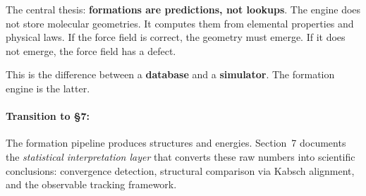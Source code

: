 \documentclass[11pt]{article}
\begin{document}
The central thesis: \textbf{formations are predictions, not lookups}. The engine does not store molecular geometries. It computes them from elemental properties and physical laws. If the force field is correct, the geometry must emerge. If it does not emerge, the force field has a defect.

This is the difference between a \textbf{database} and a \textbf{simulator}. The formation engine is the latter.

\paragraph{Transition to \S7:} The formation pipeline produces structures and energies. Section~7 documents the \textit{statistical interpretation layer} that converts these raw numbers into scientific conclusions: convergence detection, structural comparison via Kabsch alignment, and the observable tracking framework.
\end{document}

